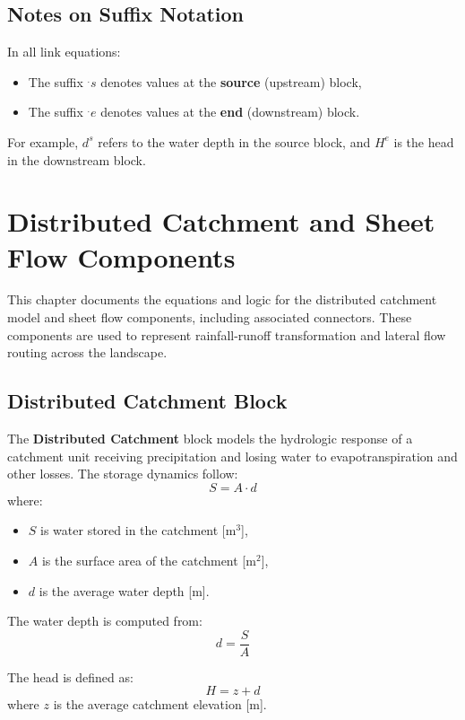 \documentclass[12pt]{report}
\begin{document}
\section{Notes on Suffix Notation}

In all link equations:
\begin{itemize}
  \item The suffix $^.s$ denotes values at the \textbf{source} (upstream) block,
  \item The suffix $^.e$ denotes values at the \textbf{end} (downstream) block.
\end{itemize}
For example, $d^s$ refers to the water depth in the source block, and $H^e$ is the head in the downstream block.

\chapter{Distributed Catchment and Sheet Flow Components}

This chapter documents the equations and logic for the distributed catchment model and sheet flow components, including associated connectors. These components are used to represent rainfall-runoff transformation and lateral flow routing across the landscape.

\section{Distributed Catchment Block}

The \textbf{Distributed Catchment} block models the hydrologic response of a catchment unit receiving precipitation and losing water to evapotranspiration and other losses. The storage dynamics follow:
\begin{equation}
S = A \cdot d
\end{equation}
where:
\begin{itemize}
  \item $S$ is water stored in the catchment [m$^3$],
  \item $A$ is the surface area of the catchment [m$^2$],
  \item $d$ is the average water depth [m].
\end{itemize}

The water depth is computed from:
\begin{equation}
d = \frac{S}{A}
\end{equation}

The head is defined as:
\begin{equation}
H = z + d
\end{equation}
where $z$ is the average catchment elevation [m].
\end{document}
